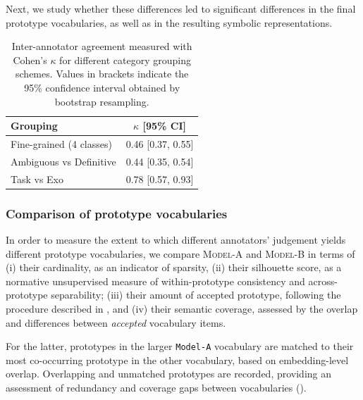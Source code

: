                 Next, we study whether these differences led to significant differences in the final prototype vocabularies, as well as in the resulting symbolic representations.

                \begin{table}[ht]
                    \centering
                    \caption{Inter-annotator agreement measured with Cohen's $\kappa$ for different category grouping schemes. Values in brackets indicate the 95\% confidence interval obtained by bootstrap resampling.}
                    \begin{tabular}{l c}
                    Grouping & $\kappa$ [95\% CI] \\
                    \midrule
                    Fine-grained (4 classes) & 0.46 [0.37, 0.55] \\
                    Ambiguous vs Definitive  & 0.44 [0.35, 0.54] \\
                    Task vs Exo              & 0.78 [0.57, 0.93] \\
                    \bottomrule
                    \end{tabular}
                \end{table}

        \subsubsection{Comparison of prototype vocabularies}  

            In order to measure the extent to which different annotators' judgement yields different prototype vocabularies, we compare \textsc{Model-A} and \textsc{Model-B} in terms of (i) their cardinality, as an indicator of sparsity, (ii) their silhouette score, as a normative unsupervised measure of within-prototype consistency and across-prototype separability; (iii) their amount of accepted prototype, following the procedure described in , and (iv) their semantic coverage, assessed by the overlap and differences between \textit{accepted} vocabulary items. 

            For the latter, prototypes in the larger \texttt{Model-A} vocabulary are matched to their most co-occurring prototype in the other vocabulary, based on embedding-level overlap. Overlapping and unmatched prototypes are recorded, providing an assessment of redundancy and coverage gaps between vocabularies (). %
        
